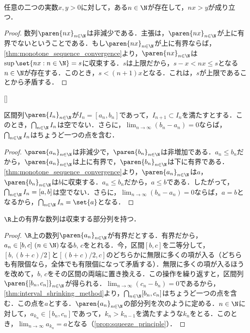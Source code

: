 \documentclass[a4paper,10pt]{ltjsarticle}
\begin{document}
\begin{MyTheorem}
  任意の二つの実数\(x, y > 0\)に対して，ある\(n \in \N\)が存在して，\(nx > y\)が成り立つ．
\end{MyTheorem}
\begin{proof}
  数列\(\paren{nx}_{n\in\N}\)は非減少である．主張は，\(\paren{nx}_{n\in\N}\)が上に有界でないということである．もし\(\paren{nx}_{n\in\N}\)が上に有界ならば，\cref{thm:monotone_sequence_convergence}より，\(\paren{nx}_{n\in\N}\)は\(\sup\set{nx:n\in\N} = s\)に収束する．\(s\)は上限だから，\(s - x < nx \le s\)となる\(n \in \N\)が存在する．このとき，\(s < (n + 1)x\)となる．これは，\(s\)が上限であることから矛盾する．
\end{proof}
[]
\begin{MyTheorem}
  区間列\(\paren{I_n}_{n\in\N}\)が\(I_n = [a_n, b_n]\)であって，\(I_{n+1} \subset I_n\)を満たすとする．このとき，\(\bigcap_{n \in \N}I_n\)は空でない．さらに，\(\lim_{n \to \infty}(b_n - a_n) = 0\)ならば，\(\bigcap_{n \in \N}I_n\)はちょうど一つの点を含む．
\end{MyTheorem}
\begin{proof}
  \(\paren{a_n}_{n\in\N}\)は非減少で，\(\paren{b_n}_{n\in\N}\)は非増加である．\(a_n \le b_n\)だから，\(\paren{a_n}_{n\in\N}\)は上に有界で，\(\paren{b_n}_{n\in\N}\)は下に有界である．\cref{thm:monotone_sequence_convergence}より，\(\paren{a_n}_{n\in\N}\)は\(a\)，\(\paren{b_n}_{n\in\N}\)は\(b\)に収束する．\(a_n \le b_n\)だから，\(a \le b\)である．したがって，\(\bigcap_{n \in \N}I_n = [a, b]\)は空でない．さらに，\(\lim_{n \to \infty}(b_n - a_n) = 0\)ならば，\(a = b\)となるから，\(\bigcap_{n \in \N}I_n = \set{a}\)となる．
\end{proof}

\begin{MyTheorem}
  \(\R\)上の有界な数列は収束する部分列を持つ．
\end{MyTheorem}
\begin{proof}
  \(\R\)上の数列\(\paren{a_n}_{n\in\N}\)が有界だとする．有界だから，\(a_n \in [b, c]\ (n \in \N)\)なる\(b\), \(c\)をとれる．今，区間\([b, c]\)を二等分して，\([b, (b+c)/2]\)と\([(b+c)/2, c]\)のどちらかに無限に多くの項が入る（どちらも有限個なら，全体でも有限個になって矛盾する）．無限に多くの項が入るほうを改めて，\(b\), \(c\)をその区間の両端に置き換える．この操作を繰り返すと，区間列\(\paren{[b_n, c_n]}_{n\in\N}\)が得られる．\(\lim_{n \to \infty}(c_n - b_n) = 0\)であるから，\cref{thm:interval_shrinking_method}より，\(\bigcap_{n \in \N}[b_n, c_n]\)はちょうど一つの点を含む．この点を\(a\)とする．\(\paren{a_n}_{n\in\N}\)の部分列を次のように定める．\(n \in \N\)に対して，\(a_{k_n} \in [b_n, c_n]\)であって，\(k_n > k_{n-1}\)を満たすような\(k_n\)をとる．このとき，\(\lim_{n \to \infty}a_{k_n} = a\)となる（\cref{prop:squeeze_principle}）．
\end{proof}
\end{document}
